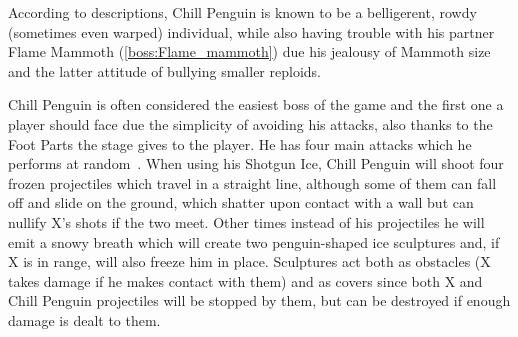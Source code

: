 According to descriptions, Chill Penguin is known to be a belligerent, rowdy (sometimes even warped) individual, while also having trouble with his partner Flame Mammoth (\ref{boss:Flame_mammoth}) due his jealousy of Mammoth size and the latter attitude of bullying smaller reploids.


Chill Penguin is often considered the easiest boss of the game and the first one a player should face due the simplicity of avoiding his attacks, also thanks to the Foot Parts the stage gives to the player. He has four main attacks which he performs at random~\cite{wiki:Chill_Penguin}. When using his Shotgun Ice, Chill Penguin will shoot four frozen projectiles which travel in a straight line, although some of them  can fall off and slide on the ground, which shatter upon contact with a wall but can nullify X's shots if the two meet. Other times instead of his projectiles he will emit a snowy breath which will create two penguin-shaped ice sculptures and, if X is in range, will also freeze him in place. Sculptures act both as obstacles (X takes damage if he makes contact with them) and as covers since both X and Chill Penguin projectiles will be stopped by them, but can be destroyed if enough damage is dealt to them.

